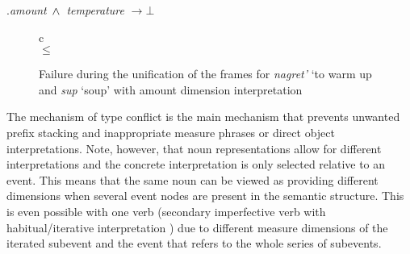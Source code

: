 \ex.\label{const:temp:amount}\textit{amount} $\,\wedge\,$ \textit{temperature} $\rightarrow \bot$

\begin{figure}
\begin{tabular}{c}
\\
 $\leq$ 
\end{tabular}
\caption{Failure during the unification of the frames for \textit{nagret'} `to warm up and  \textit{sup} `soup' with amount dimension interpretation \label{frame:nagret:soup:amount}}
\end{figure}

The mechanism of type conflict is the main mechanism that prevents un\-want\-ed prefix stacking  and inappropriate measure phrases or direct object interpretations. Note, however, that noun representations allow for different interpretations and the concrete interpretation is only selected relative to an event. This means that the same noun can be viewed as providing different dimensions when several event nodes are present in the semantic structure. This is even possible with one verb (secondary imperfective  verb  with habitual/iterative interpretation ) due to different measure dimensions of the iterated subevent and the event that refers to the whole series of subevents.

